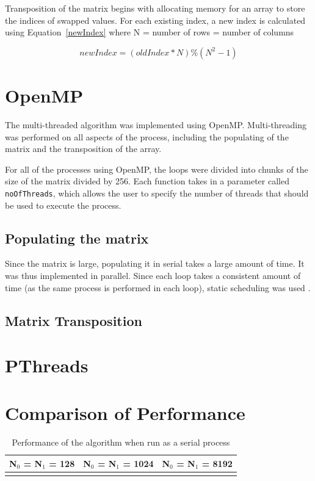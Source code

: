 \documentclass[10pt,twocolumn]{witseiepaper}
\begin{document}
Transposition of the matrix begins with allocating memory for an array to store the indices of swapped values. For each existing index, a new index is calculated using Equation~\ref{newIndex} where N = number of rows = number of columns

\begin{equation}
\label{newIndex}
newIndex = (oldIndex*N)\%(N^2-1)
\end{equation}

\section{OpenMP}
The multi-threaded algorithm was implemented using OpenMP. Multi-threading was performed on all aspects of the process, including the populating of the matrix and the transposition of the array. 

For all of the processes using OpenMP, the loops were divided into chunks of the size of the matrix divided by 256. Each function takes in a parameter called \texttt{noOfThreads}, which allows the user to specify the number of threads that should be used to execute the process.

\subsection{Populating the matrix}
Since the matrix is large, populating it in serial takes a large amount of time. It was thus implemented in parallel. Since each loop takes a consistent amount of time (as the same process is performed in each loop), static scheduling was used \cite{HPC}. 

\subsection{Matrix Transposition}


\section{PThreads}

\section{Comparison of Performance}

\begin{table}[h]
	\centering
	\caption{Performance of the algorithm when run as a serial process}
	\begin{tabular}{|c|c|c|}
	\hline
	  N$_{0}$ = N$_{1}$ = 128 &  N$_{0}$ = N$_{1}$ = 1024 & N$_{0}$ = N$_{1}$ = 8192 \\
		\hline 
		  &  &  \\ 
		\hline 
	\end{tabular} 
\end{table} 
\end{document}
